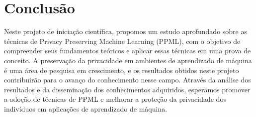 \documentclass{article}
\begin{document}
\section{Conclusão}
Neste projeto de iniciação científica, propomos um estudo aprofundado sobre as técnicas de Privacy Preserving Machine Learning (PPML), com o objetivo de compreender seus fundamentos teóricos e aplicar essas técnicas em uma prova de conceito. A preservação da privacidade em ambientes de aprendizado de máquina é uma área de pesquisa em crescimento, e os resultados obtidos neste projeto contribuirão para o avanço do conhecimento nesse campo. Através da análise dos resultados e da disseminação dos conhecimentos adquiridos, esperamos promover a adoção de técnicas de PPML e melhorar a proteção da privacidade dos indivíduos em aplicações de aprendizado de máquina.


   
\end{document}

